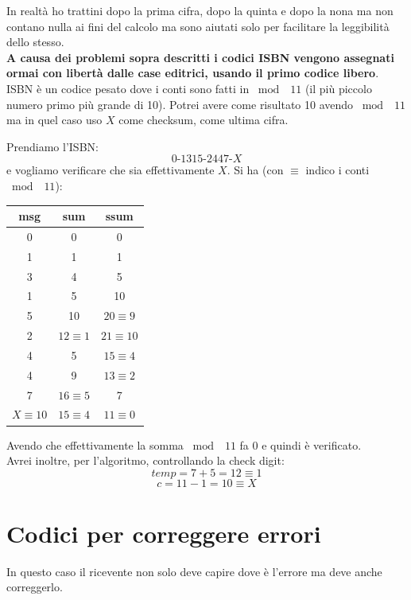\documentclass[a4paper,12pt, oneside]{book}
\begin{document}
In realtà ho trattini dopo la prima cifra, dopo la quinta e dopo la nona ma non
contano nulla ai fini del calcolo ma sono aiutati solo per facilitare la
leggibilità dello stesso.\\
\textbf{A causa dei problemi sopra descritti i codici ISBN vengono assegnati
  ormai con libertà dalle case editrici, usando il primo codice libero}.\\
ISBN è un codice pesato dove i conti sono
fatti in $\bmod\,\,\,11$ (il più piccolo numero primo più grande di 10). Potrei
avere come risultato 10 avendo $\bmod\,\,\,11$ ma in quel caso uso $X$ come
checksum, come ultima cifra.
\begin{esempio}
  Prendiamo l'ISBN:
  \[0\mbox{-}1315\mbox{-}2447\mbox{-} X\]
  e vogliamo verificare che sia effettivamente $X$. Si ha (con $\equiv$ indico i
  conti $\bmod\,\,\,11$):
  \begin{table}[H]
    \centering
    \begin{tabular}{|c|c|c|}
      \hline
      msg & sum & ssum \\
      \hline
      0 & 0 & 0\\
      1 & 1 & 1\\
      3  & 4 & 5\\
      1  & 5 & 10\\
      5 & 10 & $20\equiv 9$\\
      2& $12\equiv 1$ & $21\equiv 10$\\
      4 & 5 & $15\equiv 4$\\
      4 & 9 & $13\equiv 2$\\
      7 & $16\equiv 5$ & 7\\
      \hline
      $X\equiv 10$ & $15\equiv 4$ & $11\equiv 0$\\
      \hline
    \end{tabular}
  \end{table}
  Avendo che effettivamente la somma $\bmod\,\,\,11$ fa 0 e quindi è
  verificato.\\ 
  Avrei inoltre, per l'algoritmo, controllando la check digit:
  \[temp = 7+5=12\equiv 1\]
  \[c=11-1=10\equiv X\]
\end{esempio}
\section{Codici per correggere errori}
In questo caso il ricevente non solo deve capire dove è l'errore ma deve anche
correggerlo. 
\end{document}
